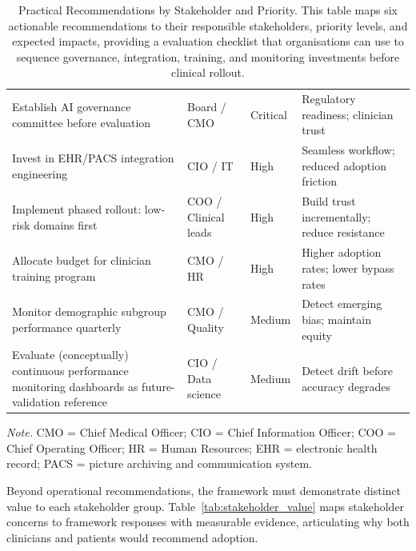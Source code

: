\begin{table}[H]
\tablestripes\tablefontsize
\tablefontsize
\caption[Practical Recommendations by Stakeholder and Priority]{Practical Recommendations by Stakeholder and Priority. This table maps six actionable recommendations to their responsible stakeholders, priority levels, and expected impacts, providing a evaluation checklist that organisations can use to sequence governance, integration, training, and monitoring investments before clinical rollout.}
\begin{tabularx}{\textwidth}{@{} L L p{2cm} L @{}}
\toprule
{} &  &  &  \\
\midrule
Establish AI governance committee before evaluation & Board / CMO & Critical & Regulatory readiness; clinician trust \\
\addlinespace
Invest in EHR/PACS integration engineering & CIO / IT & High & Seamless workflow; reduced adoption friction \\
\addlinespace
Implement phased rollout: low-risk domains first & COO / Clinical leads & High & Build trust incrementally; reduce resistance \\
\addlinespace
Allocate budget for clinician training program & CMO / HR & High & Higher adoption rates; lower bypass rates \\
\addlinespace
Monitor demographic subgroup performance quarterly & CMO / Quality & Medium & Detect emerging bias; maintain equity \\
\addlinespace
Evaluate (conceptually) continuous performance monitoring dashboards as future-validation reference & CIO / Data science & Medium & Detect drift before accuracy degrades \\
\bottomrule
\end{tabularx}
\vspace{0.5em}\noindent\textit{Note.} CMO = Chief Medical Officer; CIO = Chief Information Officer; COO = Chief Operating Officer; HR = Human Resources; EHR = electronic health record; PACS = picture archiving and communication system.
\end{table}

\noindent Beyond operational recommendations, the framework must demonstrate distinct value to each stakeholder group. Table~\ref{tab:stakeholder_value} maps stakeholder concerns to framework responses with measurable evidence, articulating why both clinicians and patients would recommend adoption.

